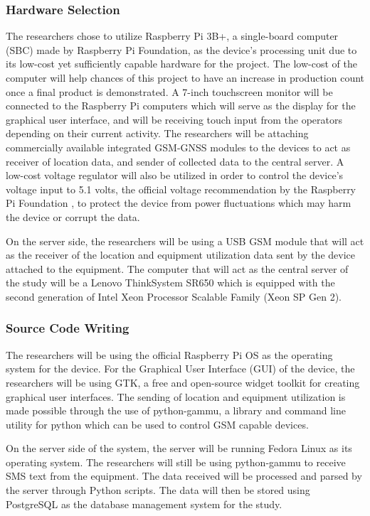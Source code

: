 \documentclass[12pt]{report}
\begin{document}
\subsubsection{Hardware Selection}

The researchers chose to utilize Raspberry Pi 3B+, a single-board computer (SBC) made by Raspberry Pi Foundation, as the device's processing unit due to its low-cost yet sufficiently capable hardware for the project. 
The low-cost of the computer will help chances of this project to have an increase in production count once a final product is demonstrated.
A 7-inch  touchscreen monitor will be connected to the Raspberry Pi computers which will serve as the display for the graphical user interface, and will be receiving touch input from the operators depending on their current activity.
The researchers will be attaching commercially available integrated GSM-GNSS modules to the devices to act as receiver of location data, and sender of collected data to the central server.
A low-cost voltage regulator will also be utilized in order to control the device's voltage input to 5.1 volts, the official voltage recommendation by the Raspberry Pi Foundation \cite{rpi}, to protect the device from power fluctuations which may harm the device or corrupt the data. 

On the server side, the researchers will be using a USB GSM module that will act as the receiver of the location and equipment utilization data sent by the device attached to the equipment. 
The computer that will act as the central server of the study will be a Lenovo ThinkSystem SR650 which is equipped with the second generation of Intel Xeon Processor Scalable Family (Xeon SP Gen 2).

\subsubsection{Source Code Writing}

The researchers will be using the official Raspberry Pi OS as the operating system for the device.
For the Graphical User Interface (GUI) of the device, the researchers will be using GTK, a free and open-source widget toolkit for creating graphical user interfaces.
The sending of location and equipment utilization is made possible through the use of python-gammu, a library and command line utility for python which can be used to control GSM capable devices. 

On the server side of the system, the server will be running Fedora Linux as its operating system.
The researchers will still be using python-gammu to receive SMS text from the equipment.
The data received will be processed and parsed by the server through Python scripts.
The data will then be stored using PostgreSQL as the database management system for the study.
\end{document}

